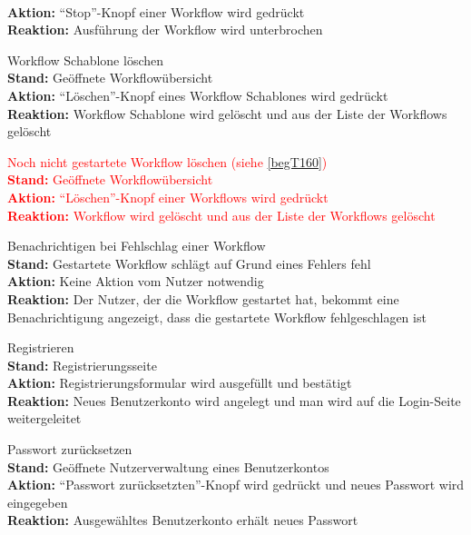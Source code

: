 \begin{enumerate}
        \\ \textbf{Aktion:} \enquote{Stop}-Knopf einer \gls{Workflow} wird gedrückt
        \\ \textbf{Reaktion:} Ausführung der \gls{Workflow} wird unterbrochen
    \item \gls{Workflow Schablone} löschen
        \\ \textbf{Stand:} Geöffnete Workflowübersicht
        \\ \textbf{Aktion:} \enquote{Löschen}-Knopf eines \glspl{Workflow Schablone} wird gedrückt
        \\ \textbf{Reaktion:} \gls{Workflow Schablone} wird gelöscht und aus der Liste der Workflows gelöscht
    \textcolor{red}{
    \item Noch nicht gestartete \gls{Workflow} löschen (siehe \ref{begT160})
        \\ \textbf{Stand:} Geöffnete Workflowübersicht
        \\ \textbf{Aktion:} \enquote{Löschen}-Knopf einer \glspl{Workflow} wird gedrückt
        \\ \textbf{Reaktion:} \gls{Workflow} wird gelöscht und aus der Liste der Workflows gelöscht 
        }
    \item Benachrichtigen bei Fehlschlag einer \gls{Workflow}
        \\ \textbf{Stand:} Gestartete \gls{Workflow} schlägt auf Grund eines Fehlers fehl
        \\ \textbf{Aktion:} Keine Aktion vom \gls{Nutzer} notwendig
        \\ \textbf{Reaktion:} Der \gls{Nutzer}, der die \gls{Workflow} gestartet hat, bekommt eine Benachrichtigung angezeigt, dass die gestartete \gls{Workflow} fehlgeschlagen ist
    \item Registrieren
        \\ \textbf{Stand:} Registrierungsseite
        \\ \textbf{Aktion:} Registrierungsformular wird ausgefüllt und bestätigt
        \\ \textbf{Reaktion:} Neues Benutzerkonto wird angelegt und man wird auf die Login-Seite weitergeleitet
    \item Passwort zurücksetzen
        \\ \textbf{Stand:} Geöffnete Nutzerverwaltung eines Benutzerkontos
        \\ \textbf{Aktion:} \enquote{Passwort zurücksetzten}-Knopf wird gedrückt und neues Passwort wird eingegeben
        \\ \textbf{Reaktion:} Ausgewähltes Benutzerkonto erhält neues Passwort

\end{enumerate}

